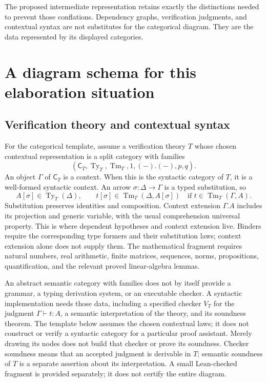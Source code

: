\documentclass[11pt]{article}
\newcommand{\Cat}[1]{\mathsf{#1}}
\newcommand{\Ty}{\operatorname{Ty}}
\newcommand{\Tm}{\operatorname{Tm}}
\begin{document}
The proposed intermediate representation retains exactly the distinctions
needed to prevent those conflations. Dependency graphs, verification
judgments, and contextual syntax are not substitutes for the categorical
diagram. They are the data represented by its displayed categories.

\section{A diagram schema for this elaboration situation}

\subsection{Verification theory and contextual syntax}

For the categorical template, assume a verification theory $T$ whose
chosen contextual representation is a split category with families
\[
 (\Cat C_T,\Ty_T,\Tm_T,1,(-).(-),p,q).
\]
An object $\Gamma$ of $\Cat C_T$ is a context. When this is the
syntactic category of $T$, it is a well-formed syntactic context. An arrow
$\sigma:\Delta\to\Gamma$ is a typed substitution, so
\[
 A[\sigma]\in\Ty_T(\Delta),\qquad
 t[\sigma]\in\Tm_T(\Delta,A[\sigma])
 \quad\text{if }t\in\Tm_T(\Gamma,A).
\]
Substitution preserves identities and composition. Context extension
$\Gamma.A$ includes its projection and generic variable, with the usual
comprehension universal property. This is where dependent hypotheses and context extension live. Binders
require the corresponding type formers and their substitution laws;
context extension alone does not supply them. The mathematical fragment requires natural numbers,
real arithmetic, finite matrices, sequences, norms, propositions,
quantification, and the relevant proved linear-algebra lemmas.

An abstract semantic category with families does not by itself provide
a grammar, a typing derivation system, or an executable checker. A
syntactic implementation needs those data, including a specified checker $V_T$ for the
judgment $\Gamma\vdash t:A$, a semantic interpretation of the theory,
and its soundness theorem. The template below assumes the chosen contextual laws; it does not
construct or verify a syntactic category for a particular proof assistant. Merely drawing its nodes does not build
that checker or prove its soundness. Checker soundness means that an
accepted judgment is derivable in $T$; semantic soundness of $T$ is a
separate assertion about its interpretation. A small Lean-checked fragment is
provided separately; it does not certify the entire diagram.
\end{document}
